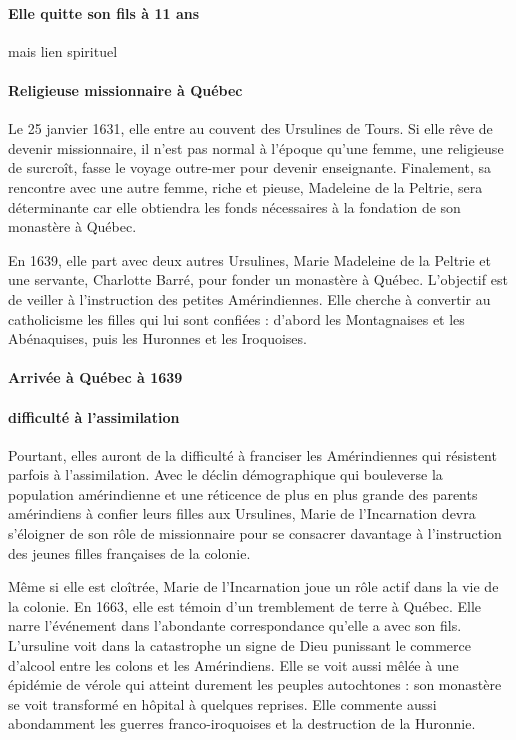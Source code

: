 \paragraph{Elle quitte son fils à 11 ans} mais lien spirituel

\paragraph{Religieuse missionnaire à Québec}


 
Le 25 janvier 1631, elle entre au couvent des Ursulines de Tours. Si elle rêve de devenir missionnaire, il n'est pas normal à l'époque qu'une femme, une religieuse de surcroît, fasse le voyage outre-mer pour devenir enseignante. Finalement, sa rencontre avec une autre femme, riche et pieuse, Madeleine de la Peltrie, sera déterminante car elle obtiendra les fonds nécessaires à la fondation de son monastère à Québec.

En 1639, elle part avec deux autres Ursulines, Marie Madeleine de la Peltrie et une servante, Charlotte Barré, pour fonder un monastère à Québec. L'objectif est de veiller à l'instruction des petites Amérindiennes. Elle cherche à convertir au catholicisme les filles qui lui sont confiées : d'abord les Montagnaises et les Abénaquises, puis les Huronnes et les Iroquoises.

\paragraph{Arrivée à Québec à 1639}

\paragraph{difficulté à l'assimilation}
Pourtant, elles auront de la difficulté à franciser les Amérindiennes qui résistent parfois à l'assimilation. Avec le déclin démographique qui bouleverse la population amérindienne et une réticence de plus en plus grande des parents amérindiens à confier leurs filles aux Ursulines, Marie de l'Incarnation devra s'éloigner de son rôle de missionnaire pour se consacrer davantage à l'instruction des jeunes filles françaises de la colonie.


 
Même si elle est cloîtrée, Marie de l'Incarnation joue un rôle actif dans la vie de la colonie. En 1663, elle est témoin d'un tremblement de terre à Québec. Elle narre l’événement dans l'abondante correspondance qu'elle a avec son fils. L'ursuline voit dans la catastrophe un signe de Dieu punissant le commerce d'alcool entre les colons et les Amérindiens. Elle se voit aussi mêlée à une épidémie de vérole qui atteint durement les peuples autochtones : son monastère se voit transformé en hôpital à quelques reprises. Elle commente aussi abondamment les guerres franco-iroquoises et la destruction de la Huronnie.

